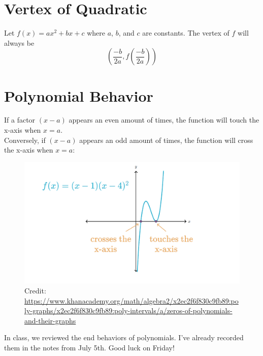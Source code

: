 \documentclass[12pt]{article}
\begin{document}
\section{Vertex of Quadratic}

Let \(f(x)=ax^2+bx+c\) where \(a\), \(b\), and \(c\) are constants. The vertex of \(f\) will always be\\

\[\left(\frac{-b}{2a}, f\left(\frac{-b}{2a}\right)\right)\]

\section{Polynomial Behavior}

If a factor \((x-a)\) appears an even amount of times, the function will touch the x-axis when \(x=a\).\\

Conversely, if \((x-a)\) appears an odd amount of times, the function will cross the x-axis when \(x=a\):

\begin{figure}[H]
	\centering
	\includegraphics[scale=1]{Polynomial touching.png}
	\caption{Credit: \url{https://www.khanacademy.org/math/algebra2/x2ec2f6f830c9fb89:poly-graphs/x2ec2f6f830c9fb89:poly-intervals/a/zeros-of-polynomials-and-their-graphs}}
\end{figure}

In class, we reviewed the end behaviors of polynomials. I've already recorded them in the notes from July 5th. Good luck on Friday!
\end{document}
